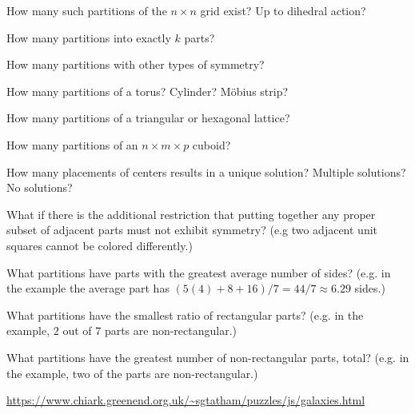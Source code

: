 \documentclass{article}
\begin{document}
\begin{question}
  How many such partitions of the $n \times n$ grid exist? Up to dihedral action?
\end{question}
\begin{related}
  \item How many partitions into exactly $k$ parts?
  \item How many partitions with other types of symmetry?
  \item How many partitions of a torus? Cylinder? M\"obius strip?
  \item How many partitions of a triangular or hexagonal lattice?
  \item How many partitions of an $n \times m \times p$ cuboid?
  \item How many placements of centers results in a unique solution? Multiple
    solutions? No solutions?
  \item What if there is the additional restriction that putting together any
    proper subset of adjacent parts must not exhibit symmetry?
    (e.g two adjacent unit squares cannot be colored differently.)
  \item What partitions have parts with the greatest average number of sides?
    (e.g. in the example the average part has
    $(5(4) + 8 + 16)/7 = 44/7 \approx 6.29$ sides.)
  \item What partitions have the smallest ratio of rectangular parts?
    (e.g. in the example, $2$ out of $7$ parts are non-rectangular.)
  \item What partitions have the greatest number of non-rectangular parts, total?
    (e.g. in the example, two of the parts are non-rectangular.)
\end{related}
\begin{references}
  \item \url{https://www.chiark.greenend.org.uk/~sgtatham/puzzles/js/galaxies.html}
\end{references}
\end{document}
